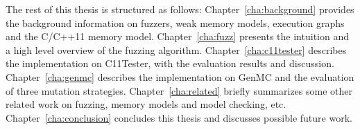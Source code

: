 
The rest of this thesis is structured as follows: Chapter~\ref{cha:background} provides the background information on fuzzers, weak memory models, execution graphs and the C/C++11 memory model. Chapter~\ref{cha:fuzz} presents the intuition and a high level overview of the fuzzing algorithm. Chapter~\ref{cha:c11tester} describes the implementation on C11Tester, with the evaluation results and discussion. Chapter~\ref{cha:genmc} describes the implementation on GenMC and the evaluation of three mutation strategies. Chapter~\ref{cha:related} briefly summarizes some other related work on fuzzing, memory models and model checking, etc. Chapter~\ref{cha:conclusion} concludes this thesis and discusses possible future work. 






